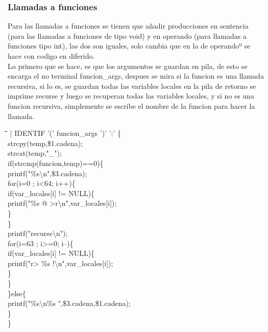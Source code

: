 \documentclass[11pt,spanish]{article}
\begin{document}
		\subsubsection*{Llamadas a funciones}
		Para las llamadas a funciones se tienen que añadir producciones en sentencia (para las llamadas a funciones de tipo void) y en operando (para llamadas a funciones tipo int), las dos son iguales, solo cambia que en la de operandoº se hace con codigo en diferido.\\
		Lo primero que se hace, es que los argumentos se guardan en pila, de esto se encarga el no terminal funcion\_args, despues se mira si la funcion es una llamada recursiva, si lo es, se guardan todas las variables locales en la pila de retorno se imprime recurse y luego se recuperan todas las variables locales, y si no es una funcion recursiva, simplemente se escribe el nombre de la funcion para hacer la llamada.
		
		\begin{tcolorbox}
		\begin{tabbing}
			\hspace*{7cm}\=\hspace*{1cm}\=\hspace*{0.5cm}\=\hspace*{0.5cm}\=\hspace*{0.5cm}\=\kill
			| IDENTIF '(' funcion\_args ')' ';'\> \{\\
			\>\>strcpy(temp,\$1.cadena);\\
			\>\>strcat(temp,"\_");\\
			\>\>if(strcmp(funcion,temp)==0)\{\\
			\>\>\>printf("\%s\textbackslash n",\$3.cadena);\\
			\>\>\>for(i=0 ; i<64; i++)\{\\
			\>\>\>\>if(var\_locales[i] != NULL)\{\\
			\>\>\>\>\>printf("\%s @ >r\textbackslash n",var\_locales[i]);\\
			\>\>\>\>\}\\
			\>\>\>\}\\
			\>\>\>printf("recurse\textbackslash n");\\
			\>\>\>for(i=63 ; i>=0; i--)\{\\
			\>\>\>\>if(var\_locales[i] != NULL)\{\\
			\>\>\>\>\>printf("r> \%s !\textbackslash n",var\_locales[i]);\\
			\>\>\>\>\}\\
			\>\>\>\}\\
			\>\>\}else\{\\
			\>\>\>printf("\%s\textbackslash n\%s ",\$3.cadena,\$1.cadena);\\
			\>\>\}\\
			\>\}
		\end{tabbing}
		\end{tcolorbox}
		
\end{document}
